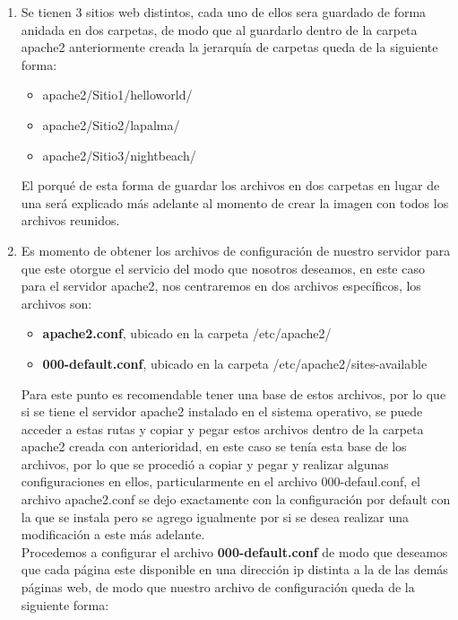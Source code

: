 \documentclass[10pt,letterpaper]{article}
\begin{document}
\begin{enumerate}
\item Se tienen 3 sitios web distintos, cada uno de ellos sera guardado de forma anidada en dos carpetas, de modo que al guardarlo dentro de la carpeta apache2 anteriormente creada la jerarqu\'ia de carpetas queda de la siguiente forma:
\begin{itemize}
\item apache2/Sitio1/helloworld/
\item apache2/Sitio2/lapalma/
\item apache2/Sitio3/nightbeach/
\end{itemize}
El porqu\'e de esta forma de guardar los archivos en dos carpetas en lugar de una ser\'a explicado m\'as adelante al momento de crear la imagen con todos los archivos reunidos.


\item Es momento de obtener los archivos de configuraci\'on de nuestro servidor para que este otorgue el servicio del modo que nosotros deseamos, en este caso para el servidor apache2, nos centraremos en dos archivos espec\'ificos, los archivos son: \\

\begin{itemize}
\item \textbf{apache2.conf}, ubicado en la carpeta /etc/apache2/ 
\item \textbf{000-default.conf}, ubicado en la carpeta /etc/apache2/sites-available
\end{itemize}
Para este punto es recomendable tener una base de estos archivos, por lo que si se tiene el servidor apache2 instalado en el sistema operativo, se puede acceder a estas rutas y copiar y pegar estos archivos dentro de la carpeta apache2 creada con anterioridad, en este caso se ten\'ia esta base de los archivos, por lo que se procedi\'o a copiar y pegar y realizar algunas configuraciones en ellos, particularmente en el archivo 000-defaul.conf, el archivo apache2.conf se dejo exactamente con la configuraci\'on por default con la que se instala pero se agrego igualmente por si se desea realizar una modificaci\'on a este m\'as adelante. \\

\newpage
Procedemos a configurar el archivo \textbf{000-default.conf} de modo que deseamos que cada p\'agina este disponible en una direcci\'on ip distinta a la de las dem\'as p\'aginas web, de modo que nuestro archivo de configuraci\'on queda de la siguiente forma:


\end{enumerate}
\end{document}

